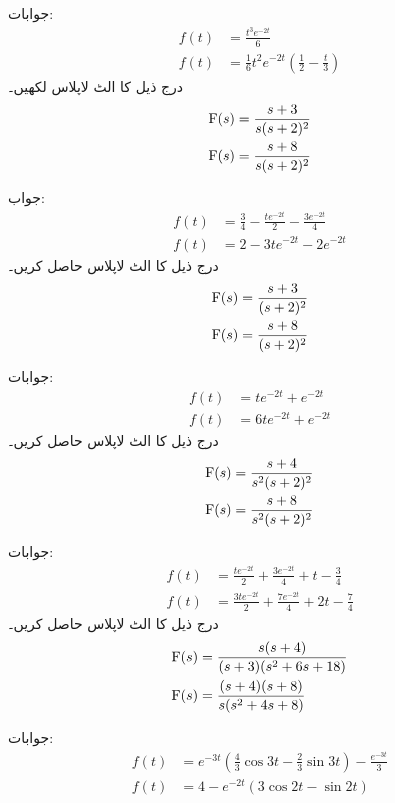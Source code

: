 جوابات:
\begin{align*}
f(t)&=\frac{t^3 e^{-2t}}{6}\\
f(t)&=\frac{1}{6}t^2e^{-2t}\left(\frac{1}{2}-\frac{t}{3}\right)
\end{align*}
درج ذیل کا الٹ لاپلاس لکھیں۔
\begin{align*}
{\ensuremath{{\textup{F}}}}(s)&=\frac{s+3}{s(s+2)^2}\\
{{\textup{F}}}(s)&=\frac{s+8}{s(s+2)^2}
\end{align*}

جواب:
\begin{align*}
f(t)&=\frac{3}{4}-\frac{te^{-2t}}{2}-\frac{3e^{-2t}}{4}\\
f(t)&=2-3te^{-2t}-2e^{-2t}
\end{align*}
درج ذیل کا الٹ لاپلاس حاصل کریں۔
\begin{align*}
{\ensuremath{{\textup{F}}}}(s)&=\frac{s+3}{(s+2)^2}\\
{{\textup{F}}}(s)&=\frac{s+8}{(s+2)^2}
\end{align*}

جوابات:
\begin{align*}
f(t)&=te^{-2t}+e^{-2t}\\
f(t)&=6te^{-2t}+e^{-2t}
\end{align*}
درج ذیل کا الٹ لاپلاس حاصل کریں۔
\begin{align*}
{\ensuremath{{\textup{F}}}}(s)&=\frac{s+4}{s^2(s+2)^2}\\
{{\textup{F}}}(s)&=\frac{s+8}{s^2(s+2)^2}
\end{align*}

جوابات:
\begin{align*}
f(t)&=\frac{te^{-2t}}{2}+\frac{3e^{-2t}}{4}+t-\frac{3}{4}\\
f(t)&=\frac{3te^{-2t}}{2}+\frac{7e^{-2t}}{4}+2t-\frac{7}{4}
\end{align*}
درج ذیل کا الٹ لاپلاس حاصل کریں۔
\begin{align*}
{\ensuremath{{\textup{F}}}}(s)&=\frac{s(s+4)}{(s+3)(s^2+6s+18)}\\
{{\textup{F}}}(s)&=\frac{(s+4)(s+8)}{s(s^2+4s+8)}
\end{align*}

جوابات:
\begin{align*}
f(t)&=e^{-3t}\left(\frac{4}{3}\cos 3t-\frac{2}{3}\sin 3t \right)-\frac{e^{-3t}}{3}\\
f(t)&=4-e^{-2t}\left(3\cos 2t-\sin 2t\right)
\end{align*}

